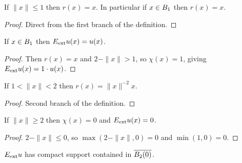 \begin{lemma}
\label{lem:unitBallRetraction_eq_self_of_norm_le_one}
\leanok
{}
If $\|x\| \le 1$ then $r(x) = x$. In particular if $x \in B_{1}$ then
$r(x) = x$.
\end{lemma}

\begin{proof}
\leanok

Direct from the first branch of the definition.
\end{proof}

\begin{lemma}
\label{lem:Eext-restrict}
\leanok
{}
If $x \in B_{1}$ then $E_{\mathrm{ext}} u(x) = u(x)$.
\end{lemma}

\begin{proof}
\leanok
{}

Then $r(x) = x$ and $2 - \|x\| > 1$, so $\chi(x) = 1$, giving
$E_{\mathrm{ext}} u (x) = 1 \cdot u(x)$.
\end{proof}

\begin{lemma}
\label{lem:unitBallRetraction_eq_smul_of_annulus}
\leanok
{}
If $1 < \|x\| < 2$ then $r(x) = \|x\|^{-2} x$.
\end{lemma}

\begin{proof}
\leanok

Second branch of the definition.
\end{proof}

\begin{lemma}
\label{lem:unitBallCutoff_eq_zero_of_two_le_norm}
\leanok
{}
If $\|x\| \ge 2$ then $\chi(x) = 0$ and $E_{\mathrm{ext}} u (x) = 0$.
\end{lemma}

\begin{proof}
\leanok

$2 - \|x\| \le 0$, so $\max(2-\|x\|,0) = 0$ and $\min(1,0) = 0$.
\end{proof}

\begin{lemma}
\label{lem:unitBallExtension_hasCompactSupport}
\leanok
{}
$E_{\mathrm{ext}} u$ has compact support contained in $\overline{B_{2}(0)}$.
\end{lemma}

